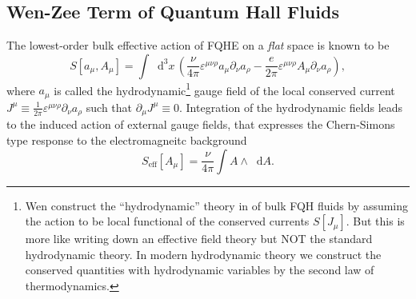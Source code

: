 \documentclass[10pt,nofootinbib,letterpaper]{revtex4}
\newcommand*\dd{\mathop{}\!\mathrm{d}}
\begin{document}
	\subsection{Wen-Zee Term of Quantum Hall Fluids}
		The lowest-order bulk effective action of FQHE on a \emph{flat} space is known to be
		\begin{equation}\label{2.2.1}
			S[a_\mu,A_\mu]=\int\dd^3x\,\left(\dfrac{\nu}{4\pi}\varepsilon^{\mu\nu\rho}a_\mu \partial_\nu a_\rho-\dfrac{e}{2\pi}\varepsilon^{\mu\nu\rho}A_\mu \partial_\nu a_\rho\right),
		\end{equation}
		where $a_\mu$ is called the hydrodynamic\footnote{Wen construct the ``hydrodynamic'' theory in \cite{wen1992classification,wen1995topological} of bulk FQH fluids by assuming the action to be local functional of the conserved currents $S[J_\mu]$. But this is more like writing down an effective field theory but NOT the standard hydrodynamic theory. In modern hydrodynamic theory we construct the conserved quantities with hydrodynamic variables by the second law of thermodynamics.} gauge field of the local conserved current $J^\mu\equiv\frac{1}{2\pi}\varepsilon^{\mu\nu\rho}\partial_\nu a_\rho$ such that $\partial_\mu J^\mu\equiv0$. Integration of the hydrodynamic fields leads to the induced action of external gauge fields, that expresses the Chern-Simons type response to the electromagneitc background
		\begin{equation}\label{2.2.2}
			S_{\text{eff}}[A_\mu]=\dfrac{\nu}{4\pi}\int A\wedge\dd A.
		\end{equation}
\end{document}
